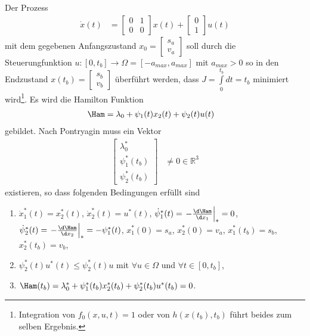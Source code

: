 \begin{exmp}\label{exmp:kap_2_zeitopt_dint}
Der Prozess 
\begin{align*}
	\dot{x}(t) & = \begin{bmatrix}
	0 &  1\\ 0 & 0
	\end{bmatrix}x(t) + \begin{bmatrix}
	0\\ 1
	\end{bmatrix}u(t)
\end{align*}
mit dem gegebenen Anfangszustand $x_0=\begin{bmatrix}
s_a\\ v_a
\end{bmatrix}$ soll durch die Steuerungfunktion $u:[0,t_b]\rightarrow \Omega= [-a_{max},a_{max}]$ mit $a_{max}>0$ so in den Endzustand
$x(t_b)=\begin{bmatrix}
s_b\\ v_b
\end{bmatrix}$ überführt werden, dass $J =\int\limits_0^{t_b}dt=t_b$ minimiert wird\footnote{Integration von $f_0(x,u,t)=1$ oder von $h(x(t_b),t_b)$
führt beides zum selben Ergebnis.}. Es wird die Hamilton Funktion
\begin{align*}
	\Ham & = \lambda_0 + \psi_1(t)x_2(t) + \psi_2(t)u(t)
\end{align*}
gebildet. Nach Pontryagin muss ein Vektor 
\begin{align}
	\begin{bmatrix}
	\lambda_0^{\ast}\\ \psi_1^{\ast}(t_b)\\ \psi_2^{\ast}(t_b)
	\end{bmatrix} & \neq 0 \in\mathbb{R}^3	\label{eqn:kap_2_bsp_1_vektor_pont}
\end{align}
existieren, so dass folgenden Bedingungen erfüllt sind
\begin{enumerate}[label=(\alph*)]
  \item $\dot{x}_1^{\ast}(t)=x_2^{\ast}(t)$, $\dot{x}_2^{\ast}(t)=u^{\ast}(t)$, $\dot{\psi}_1^{\ast}(t)=\left.-\frac{\d \Ham}{\d
  x_1}\right|_{\ast}=0$, $\dot{\psi}_2^{\ast}(t)=\left.-\frac{\d \Ham}{\d x_2}\right|_{\ast}=-\psi_1^{\ast}(t)$, $x_1^{\ast}(0)=s_a$,
  $x_2^{\ast}(0)=v_a$, $x_1^{\ast}(t_b)=s_b$, $x_2^{\ast}(t_b)=v_b$,
  \item $\psi_2^{\ast}(t)u^{\ast}(t)\leq\psi_2^{\ast}(t)u$ mit $\forall u\in\Omega$ und $\forall t\in[0,t_b]$,
  \item $\Ham(t_b)= \lambda_0^{\ast}+\psi_1^{\ast}(t_b)x_2^{\ast}(t_b)+\psi_2^{\ast}(t_b)u^{\ast}(t_b)=0$.

\end{enumerate}
\end{exmp}
